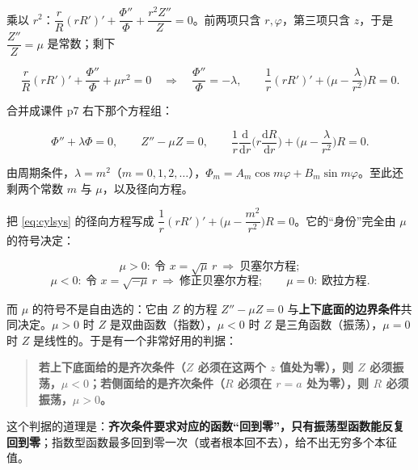 \documentclass[11pt]{ctexart}
\let\origsubhdr\subhdr
\renewcommand{\subhdr}[1]{\par\needspace{3\baselineskip}\origsubhdr{#1}}
\begin{document}
乘以 $r^2$：$\dfrac{r}{R}(rR')'+\dfrac{\Phi''}{\Phi}+\dfrac{r^2Z''}{Z}=0$。前两项只含 $r,\varphi$，第三项只含 $z$，于是 $\dfrac{Z''}{Z}=\mu$ 是常数；剩下

\[
\frac{r}{R}(rR')'+\frac{\Phi''}{\Phi}+\mu r^2=0
\quad\Longrightarrow\quad
\frac{\Phi''}{\Phi}=-\lambda,\qquad
\frac1r(rR')'+\Big(\mu-\frac{\lambda}{r^2}\Big)R=0 .
\]

合并成课件 p7 右下那个方程组：

\begin{equation}
\Phi''+\lambda\Phi=0,
\qquad
Z''-\mu Z=0,
\qquad
\frac1r\frac{\mathrm d}{\mathrm dr}\Big(r\frac{\mathrm dR}{\mathrm dr}\Big)+\Big(\mu-\frac{\lambda}{r^2}\Big)R=0 .
\label{eq:cylsys}
\end{equation}

由周期条件，$\lambda=m^2$（$m=0,1,2,\dots$），$\Phi_m=A_m\cos m\varphi+B_m\sin m\varphi$。至此还剩两个常数 $m$ 与 $\mu$，以及径向方程。


把 \eqref{eq:cylsys} 的径向方程写成 $\dfrac1r(rR')'+\Big(\mu-\dfrac{m^2}{r^2}\Big)R=0$。它的“身份”完全由 $\mu$ 的符号决定：

\[
\mu>0:\ \text{令 }x=\sqrt\mu\,r\ \Rightarrow\ \text{贝塞尔方程};
\]
\[
\mu<0:\ \text{令 }x=\sqrt{-\mu}\,r\ \Rightarrow\ \text{修正贝塞尔方程};
\qquad
\mu=0:\ \text{欧拉方程}.
\]

而 $\mu$ 的符号不是自由选的：它由 $Z$ 的方程 $Z''-\mu Z=0$ 与\textbf{上下底面的边界条件}共同决定。$\mu>0$ 时 $Z$ 是双曲函数（指数），$\mu<0$ 时 $Z$ 是三角函数（振荡），$\mu=0$ 时 $Z$ 是线性的。于是有一个非常好用的判据：

\begin{quote}
\textbf{若上下底面给的是齐次条件（$Z$ 必须在这两个 $z$ 值处为零），则 $Z$ 必须振荡，$\mu<0$；若侧面给的是齐次条件（$R$ 必须在 $r=a$ 处为零），则 $R$ 必须振荡，$\mu>0$。}
\end{quote}

这个判据的道理是：\textbf{齐次条件要求对应的函数“回到零”，只有振荡型函数能反复回到零}；指数型函数最多回到零一次（或者根本回不去），给不出无穷多个本征值。

\end{document}
